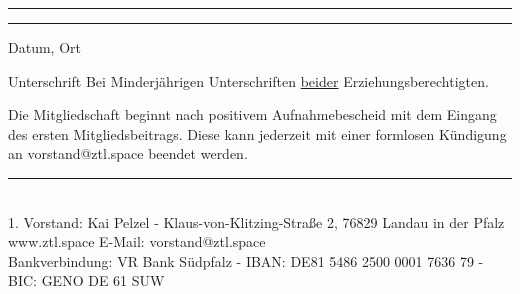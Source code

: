 \documentclass[a4paper, 11pt]{scrartcl}
\begin{document}
\vspace{25pt}
\par
\noindent\rule{5cm}{.4pt}\hfill\rule{5.1cm}{.4pt}\par
\noindent\parbox[t]{5cm}{Datum, Ort}\hfill\parbox[t]{5cm}{Unterschrift {\tiny Bei Minderjährigen Unterschriften \underline{beider} Erziehungsberechtigten.}}
\vspace{25pt}

Die Mitgliedschaft beginnt nach positivem Aufnahmebescheid mit dem Eingang des ersten Mitgliedsbeitrags. Diese kann jederzeit mit einer formlosen Kündigung an vorstand@ztl.space beendet werden.

\vspace{15pt}
\begin{center}
\rule{15cm}{.4pt}\\ 
1. Vorstand: Kai Pelzel - Klaus-von-Klitzing-Straße 2, 76829 Landau in der Pfalz \\
www.ztl.space E-Mail: vorstand@ztl.space \\
Bankverbindung: VR Bank Südpfalz - IBAN: DE81 5486 2500 0001 7636 79 - BIC: GENO DE 61 SUW
\end{center}
\end{document}
